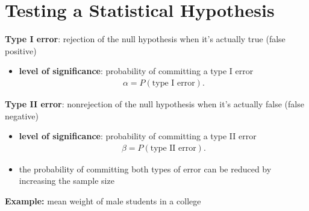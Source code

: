 \documentclass[10pt]{article}
\begin{document}
\section{Testing a Statistical Hypothesis}
\begin{definition}
    \textbf{Type I error}: rejection of the null hypothesis when it's actually true (false positive)
    \begin{itemize}
        \item \textbf{level of significance}: probability of committing a type I error
            \begin{gather*}
                \alpha = P(\text{type I error})
            .\end{gather*}
    \end{itemize}
\end{definition}
\begin{definition}
    \textbf{Type II error}: nonrejection of the null hypothesis when it's actually false (false negative)
    \begin{itemize}
        \item \textbf{level of significance}: probability of committing a type II error 
            \begin{gather*}
                \beta = P(\text{type II error})
            .\end{gather*}
    \end{itemize}
\end{definition}
\begin{itemize}
    \item the probability of committing both types of error can be reduced by increasing the sample size
\end{itemize}
\textbf{Example:} mean weight of male students in a college
\end{document}
